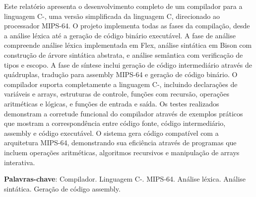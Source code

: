 \documentclass[
	12pt,				%
	oneside,
	a4paper,			%
	english,			%
	french,				%
	spanish,			%
	brazil,				%
	]{abntex2}
\begin{document}

\frenchspacing 


\imprimircapa

\imprimirfolhaderosto*

\setlength{\absparsep}{18pt}
\begin{resumo}

Este relatório apresenta o desenvolvimento completo de um compilador para a linguagem C-, uma versão simplificada da linguagem C, direcionado ao processador MIPS-64. O projeto implementa todas as fases da compilação, desde a análise léxica até a geração de código binário executável. A fase de análise compreende análise léxica implementada em Flex, análise sintática em Bison com construção de árvore sintática abstrata, e análise semântica com verificação de tipos e escopo. A fase de síntese inclui geração de código intermediário através de quádruplas, tradução para assembly MIPS-64 e geração de código binário. O compilador suporta completamente a linguagem C-, incluindo declarações de variáveis e arrays, estruturas de controle, funções com recursão, operações aritméticas e lógicas, e funções de entrada e saída. Os testes realizados demonstram a corretude funcional do compilador através de exemplos práticos que mostram a correspondência entre código fonte, código intermediário, assembly e código executável. O sistema gera código compatível com a arquitetura MIPS-64, demonstrando sua eficiência através de programas que incluem operações aritméticas, algoritmos recursivos e manipulação de arrays interativa.

\noindent
\textbf{Palavras-chave}: Compilador. Linguagem C-. MIPS-64. Análise léxica. Análise sintática. Geração de código assembly.
\end{resumo}

\listoffigures*
\clearpage

\listoftables*
\clearpage

\tableofcontents*
\end{document}
